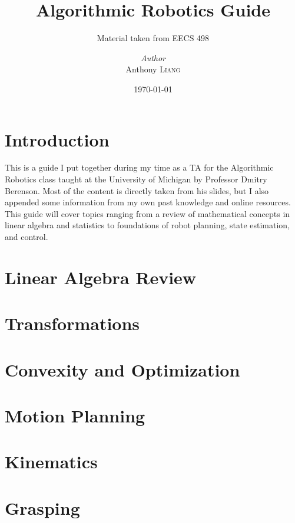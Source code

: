 \documentclass[a4paper, 12pt]{report}
\title{Algorithmic Robotics Guide}
\subtitle{Material taken from EECS 498}
\author{\textit{Author}\\Anthony \textsc{Liang}}
\date{\today}
\begin{document}
    \maketitle
    \romantableofcontents

    \chapter{Introduction}

    This is a guide I put together during my time as a TA for the Algorithmic Robotics class taught at the University of Michigan by Professor Dmitry Berenson. Most of the content is directly taken from his slides, but I also appended some information from my own past knowledge and online resources. This guide will cover topics ranging from a review of mathematical concepts in linear algebra and statistics to foundations of robot planning, state estimation, and control.

    \chapter{Linear Algebra Review}

    

    \chapter{Transformations}

    

    \chapter{Convexity and Optimization}

    

    \chapter{Motion Planning}

    

    \chapter{Kinematics}

    

    \chapter{Grasping}
\end{document}
